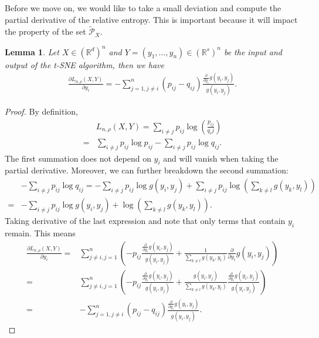 \documentclass[10pt]{article}
\newtheorem{lemma}{\bf Lemma}
\newenvironment{Proof of lemma}{\noindent{\bf Proof of Lemma}}{\hfill$\Box$\newline}
\newenvironment{Proof of claim}{\noindent{\bf Proof of claim}}{\hfill$\Box$\newline}
\newenvironment{Proof of theorem}{\noindent{\bf Proof of Theorem}}{\hfill\scriptsize{$\Box$}\newline}
\newenvironment{Proof of theorems}{\noindent{\bf Proof of Theorems}}{\hfill$\Box$\newline}
\newenvironment{Proof of proposition}{\noindent{\bf Proof of Proposition}}{\hfill$\Box$\newline}
\newenvironment{Proof of propositions}{\noindent{\bf Proof of Propositions}}{\hfill$\Box$\newline}
\newenvironment{Proof of exercise}{\noindent{\it Proof of Exercise:}}{\hfill$\Box$}
\numberwithin{equation}{section}
\begin{document}
Before we move on, we would like to take a small deviation and compute the
partial derivative of the relative entropy. This is important because it will
impact the property of the set $\tilde{\mathcal{P}}_X$.
\begin{lemma} \label{derivative_lemma}
    Let $X \in (\mathbb{R}^d)^n$ and $Y = (y_1,\dots,y_n)\in (\mathbb{R}^s)^n$ be the input and output of the t-SNE algorithm, then we have
    \begin{align}
        \frac{\partial L_{n, \rho}(X,Y)}{\partial y_i} = -\sum_{j=1, j \neq i}^n (p_{ij}-q_{ij}) \frac{\frac{\partial}{\partial y_i}g(y_i,y_j)}{g(y_i,y_j)}.
    \end{align}
\end{lemma}
\begin{proof}
    By definition,
    \begin{align}
          & L_{n, \rho}(X,Y) = \sum_{i \neq j} p_{ij} \log \left(\frac{p_{ij}}{q_ij}\right) \nonumber \\
        = & \sum_{i \neq j} p_{ij} \log p_{ij} - \sum_{i \neq j} p_{ij} \log q_{ij}.
    \end{align}
    The first summation does not depend on $y_i$ and will vanish when taking the partial derivative. Moreover, we can further breakdown the second summation:
    \begin{align}
          & - \sum_{i \neq j} p_{ij} \log q_{ij} = - \sum_{i \neq j} p_{ij} \log g(y_i,y_j) + \sum_{i \neq j} p_{ij} \log \left(\sum_{k \neq l} g(y_k,y_l) \right)\nonumber \\
        = & - \sum_{i \neq j} p_{ij} \log g(y_i,y_j) + \log \left(\sum_{k \neq l} g(y_k,y_l)\right).
    \end{align}
    Taking derivative of the last expression and note that only terms that contain $y_i$ remain. This means
    \begin{align} \label{L_derivative}
        \frac{\partial L_{n, \rho}(X,Y)}{\partial y_i} = & \sum_{j \neq i, j = 1}^n \left(-p_{ij}\frac{\frac{\partial}{\partial y_i}g(y_i,y_j)}{g(y_i,y_j)} + \frac{1}{\sum_{k \neq l} g(y_k,y_l)} \frac{\partial}{\partial y_i} g(y_i,y_j)\right) \nonumber                            \\
        =                                                & \sum_{j \neq i, j = 1}^n \left(-p_{ij}\frac{\frac{\partial}{\partial y_i}g(y_i,y_j)}{g(y_i,y_j)} + \frac{g(y_i,y_j)}{\sum_{k \neq l} g(y_k,y_l)} \frac{\frac{\partial}{\partial y_i}g(y_i,y_j)}{g(y_i,y_j)}\right) \nonumber \\
        =                                                & -\sum_{j=1, j \neq i}^n (p_{ij}-q_{ij}) \frac{\frac{\partial}{\partial y_i}g(y_i,y_j)}{g(y_i,y_j)}.
    \end{align}
\end{proof}
\end{document}
